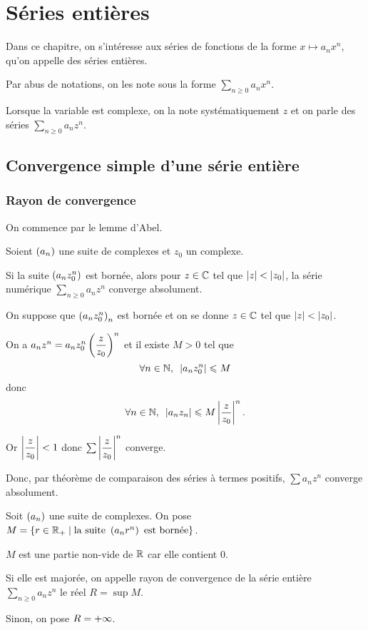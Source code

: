 \chapter{Séries entières}

\minitoc

Dans ce chapitre, on s'intéresse aux séries de fonctions de la forme \(x\mapsto a_nx^n\), qu'on appelle des séries entières.

Par abus de notations, on les note sous la forme \(\sum_{n\geq0}a_nx^n\).

Lorsque la variable est complexe, on la note systématiquement \(z\) et on parle des séries \(\sum_{n\geq0}a_nz^n\).

\section{Convergence simple d'une série entière}

\subsection{Rayon de convergence}

On commence par le lemme d'Abel.

\begin{prop}
Soient \(\left(a_n\right)\) une suite de complexes et \(z_0\) un complexe.

Si la suite \(\left(a_nz_0^n\right)\) est bornée, alors pour \(z\in\mathbb{C}\) tel que \(\left\lvert z\right\rvert<\left\lvert z_0\right\rvert\), la série numérique \(\sum_{n\geq0}a_nz^n\) converge absolument.
\end{prop}

\begin{dem}
On suppose que \(\left(a_nz_0^n\right)_n\) est bornée et on se donne \(z\in\mathbb{C}\) tel que \(\left\lvert z\right\rvert<\left\lvert z_0\right\rvert\).

On a \(a_nz^n=a_nz_0^n\left(\dfrac{z}{z_0}\right)^n\) et il existe \(M>0\) tel que \[\quantifs{\forall n\in\N}\abs{a_nz_0^n}\leq M\] donc \[\quantifs{\forall n\in\N}\abs{a_nz_n}\leq M\abs{\dfrac{z}{z_0}}^n.\]

Or \(\left\lvert\dfrac{z}{z_0}\right\rvert<1\) donc \(\sum\left\lvert\dfrac{z}{z_0}\right\rvert^n\) converge.

Donc, par théorème de comparaison des séries à termes positifs, \(\sum a_nz^n\) converge absolument.
\end{dem}

\begin{defi}
Soit \(\left(a_n\right)\) une suite de complexes. On pose \(M=\left\lbrace r\in\mathbb{R}_+\;\middle|\;\text{la suite }\left(a_nr^n\right)\text{ est bornée}\right\rbrace\).

\(M\) est une partie non-vide de \(\mathbb{R}\) car elle contient \(0\).

Si elle est majorée, on appelle rayon de convergence de la série entière \(\sum_{n\geq0}a_nz^n\) le réel \(R=\sup M\).

Sinon, on pose \(R=+\infty\).
\end{defi}

